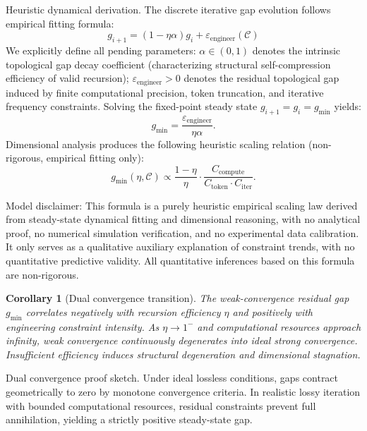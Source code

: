 \documentclass[conference]{IEEEtran}
\newtheorem{corollary}{Corollary}[section]
\theoremstyle{remark}
\newcommand{\cC}{\mathcal{C}}
\begin{document}
Heuristic dynamical derivation. The discrete iterative gap evolution follows empirical fitting formula:
\begin{equation}
g_{i+1} = (1-\eta\alpha)g_i + \varepsilon_{\text{engineer}}(\cC)
\end{equation}
We explicitly define all pending parameters: $\alpha\in(0,1)$ denotes the intrinsic topological gap decay coefficient (characterizing structural self-compression efficiency of valid recursion); $\varepsilon_{\text{engineer}}>0$ denotes the residual topological gap induced by finite computational precision, token truncation, and iterative frequency constraints. Solving the fixed-point steady state $g_{i+1}=g_i=g_{\min}$ yields:
\begin{equation}
g_{\min} = \frac{\varepsilon_{\text{engineer}}}{\eta\alpha}.
\end{equation}
Dimensional analysis produces the following heuristic scaling relation (non-rigorous, empirical fitting only):
\begin{equation}
\label{eq:scaling}
g_{\min}(\eta,\cC) \propto \frac{1-\eta}{\eta} \cdot \frac{C_{\text{compute}}}{C_{\text{token}} \cdot C_{\text{iter}}}.
\end{equation}

Model disclaimer: This formula is a purely heuristic empirical scaling law derived from steady-state dynamical fitting and dimensional reasoning, with no analytical proof, no numerical simulation verification, and no experimental data calibration. It only serves as a qualitative auxiliary explanation of constraint trends, with no quantitative predictive validity. All quantitative inferences based on this formula are non-rigorous.

\begin{corollary}[Dual convergence transition]
The weak-convergence residual gap $g_{\min}$ correlates negatively with recursion efficiency $\eta$ and positively with engineering constraint intensity. As $\eta\to1^-$ and computational resources approach infinity, weak convergence continuously degenerates into ideal strong convergence. Insufficient efficiency induces structural degeneration and dimensional stagnation.
\end{corollary}

Dual convergence proof sketch. Under ideal lossless conditions, gaps contract geometrically to zero by monotone convergence criteria. In realistic lossy iteration with bounded computational resources, residual constraints prevent full annihilation, yielding a strictly positive steady-state gap.
\end{document}
